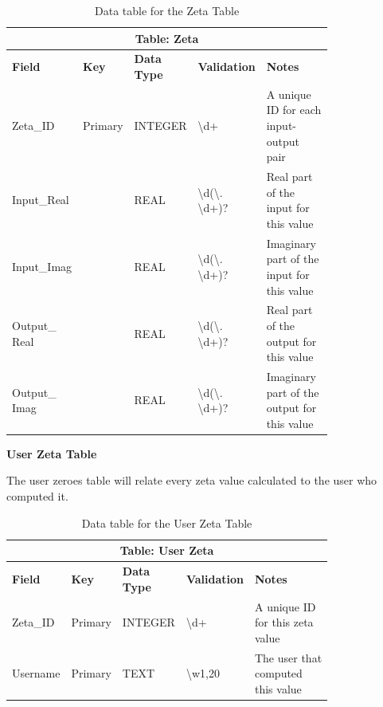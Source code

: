 \documentclass[12pt]{article}
\begin{document}
\begin{table}[ht]
    \centering
    \begin{tabular}{ | p{0.15\linewidth} | p{0.1\linewidth} | p{0.16\linewidth} | p{0.14\linewidth} | p{0.25\linewidth} | }
    \hline
    \multicolumn{5}{|c|}{\textbf{Table: Zeta}}\\
    \hline
    \hline
    \textbf{Field} & \textbf{Key} & \textbf{Data Type} & \textbf{Validation} & \textbf{Notes} \\
    \hline
    Zeta\_ID & Primary & INTEGER & \textbackslash d+ & A unique ID for each input-output pair\\
    \hline
    Input\_Real & & REAL & \textbackslash d(\textbackslash. \textbackslash d+)? & Real part of the input for this value\\
    \hline
    Input\_Imag & & REAL & \textbackslash d(\textbackslash. \textbackslash d+)? & Imaginary part of the input for this value\\
    \hline
    Output\_ Real & & REAL & \textbackslash d(\textbackslash. \textbackslash d+)? & Real part of the output for this value\\
    \hline
    Output\_ Imag & & REAL & \textbackslash d(\textbackslash. \textbackslash d+)? & Imaginary part of the output for this value\\
    \hline
    \end{tabular}
    \caption{Data table for the Zeta Table}
\end{table}

\textbf{User Zeta Table}

The user zeroes table will relate every  zeta value calculated to the user who computed it.

\begin{table}[ht]
    \centering
    \begin{tabular}{ | p{0.15\linewidth} | p{0.1\linewidth} | p{0.16\linewidth} | p{0.14\linewidth} | p{0.25\linewidth} | }
    \hline
    \multicolumn{5}{|c|}{\textbf{Table: User Zeta}}\\
    \hline
    \hline
    \textbf{Field} & \textbf{Key} & \textbf{Data Type} & \textbf{Validation} & \textbf{Notes} \\
    \hline
    Zeta\_ID & Primary & INTEGER & \textbackslash d+ & A unique ID for this zeta value\\
    \hline
    Username & Primary & TEXT & \textbackslash w{1,20}& The user that computed this value\\
    \hline
    \end{tabular}
    \caption{Data table for the User Zeta Table}
\end{table}
\end{document}
